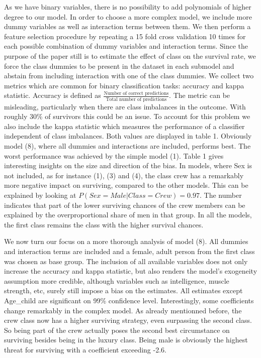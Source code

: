 \documentclass[
]{article}
\begin{document}
As we have binary variables, there is no possibility to add polynomials
of higher degree to our model. In order to choose a more complex model,
we include more dummy variables as well as interaction terms between
them. We then perform a feature selection procedure by repeating a 15
fold cross validation 10 times for each possible combination of dummy
variables and interaction terms. Since the purpose of the paper still is
to estimate the effect of class on the survival rate, we force the class
dummies to be present in the dataset in each submodel and abstain from
including interaction with one of the class dummies. We collect two
metrics which are common for binary classification tasks: accuracy and
kappa statistic. Accuracy is defined as
\(\frac{\text{Number of correct predictions}}{\text{Total number of predictions}}\).
The metric can be misleading, particularly when there are class
imbalances in the outcome. With roughly 30\% of survivors this could be
an issue. To account for this problem we also include the kappa
statistic which measures the performance of a classifier independent of
class imbalances. Both values are displayed in table 1. Obviously model
(8), where all dummies and interactions are included, performs best. The
worst performance was achieved by the simple model (1). Table 1 gives
interesting insights on the size and direction of the bias. In models,
where Sex is not included, as for instance (1), (3) and (4), the class
crew has a remarkably more negative impact on surviving, compared to the
other models. This can be explained by looking at
\(P(Sex = Male|Class = Crew) = 0.97\). The number indicates that part of
the lower surviving chances of the crew members can be explained by the
overproportional share of men in that group. In all the models, the
first class remains the class with the higher survival chances.

We now turn our focus on a more thorough analysis of model (8). All
dummies and interaction terms are included and a female, adult person
from the first class was chosen as base group. The inclusion of all
available variables does not only increase the accuracy and kappa
statistic, but also renders the model's exogeneity assumption more
credible, although variables such as intelligence, muscle strength, etc,
surely still impose a bias on the estimates. All estimates except
Age\_child are significant on 99\% confidence level. Interestingly, some
coefficients change remarkably in the complex model. As already
mentionned before, the crew class now has a higher surviving strategy,
even surpassing the second class. So being part of the crew actually
poses the second best circumstance on surviving besides being in the
luxury class. Being male is obviously the highest threat for surviving
with a coefficient exceeding -2.6.
\end{document}
